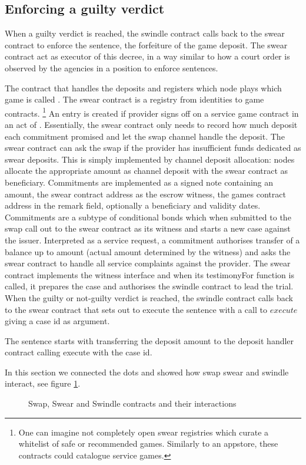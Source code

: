 \subsection{Enforcing a guilty verdict}

When a guilty verdict is reached, the swindle contract calls back to the swear contract to enforce the sentence, the forfeiture of the game deposit. The swear contract act as executor of this decree, in a way similar to how a court order is observed by the agencies in a position to enforce sentences.  

The contract that handles the deposits and registers which node plays which game is called .
The swear contract is a registry from identities to game contracts.%
%
\footnote{One can imagine not completely open swear registries which curate a whitelist of safe or recommended games. Similarly to an appstore, these contracts could catalogue service games.}
%
An entry is created if provider signs off on a service game contract in an act of . Essentially, the swear contract only needs to record how much deposit each commitment promised and let the swap channel handle the deposit.
The swear contract can  ask the swap if the provider has insufficient funds dedicated as  swear deposits. This is simply implemented by channel deposit allocation: nodes allocate the appropriate amount as channel deposit with the swear contract as beneficiary.
Commitments are implemented as a signed note containing an amount, the swear contract address as the escrow witness, the games contract address in the remark field, optionally a beneficiary and validity dates. Commitments are a subtype of conditional bonds which when submitted to the swap call out to the swear contract as its witness and starts a new case against the issuer. Interpreted as a service request, a commitment authorises transfer of a balance up to amount (actual amount determined by the witness) and asks the swear contract to handle all service complaints against the provider. The swear contract implements the witness interface and when its testimonyFor function is called, it prepares the case and authorises the swindle contract to lead the trial. When the guilty or not-guilty verdict is reached, the swindle contract calls back to the swear contract that sets out to execute the sentence with a call to $execute$ giving a case id as argument.

The sentence starts with transferring the deposit amount to the deposit handler contract calling execute with the case id.


In this section we connected the dots and showed how swap swear and swindle interact, see figure \ref{fig:sw3}.

\begin{center}
\begin{figure}
\begin{center}
\begin{tikzpicture}
\end{tikzpicture}
\end{center}
\caption{Swap, Swear and Swindle contracts and their interactions}
\label{fig:sw3}
\end{figure}
\end{center}